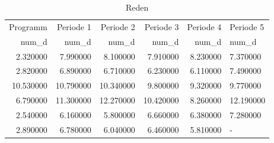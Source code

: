 \begin{table}
\caption{Reden}
\label{tab:meine_tabelle}
\begin{tabular}{rrrrrl}
\toprule
Programm & Periode 1 & Periode 2 & Periode 3 & Periode 4 & Periode 5 \\
num_d & num_d & num_d & num_d & num_d & num_d \\
\midrule
2.320000 & 7.990000 & 8.100000 & 7.910000 & 8.230000 & 7.370000 \\
2.820000 & 6.890000 & 6.710000 & 6.230000 & 6.110000 & 7.490000 \\
10.530000 & 10.790000 & 10.340000 & 9.800000 & 9.320000 & 9.770000 \\
6.790000 & 11.300000 & 12.270000 & 10.420000 & 8.260000 & 12.190000 \\
2.540000 & 6.160000 & 5.800000 & 6.660000 & 6.380000 & 7.280000 \\
2.890000 & 6.780000 & 6.040000 & 6.460000 & 5.810000 & - \\
\bottomrule
\end{tabular}
\end{table}
